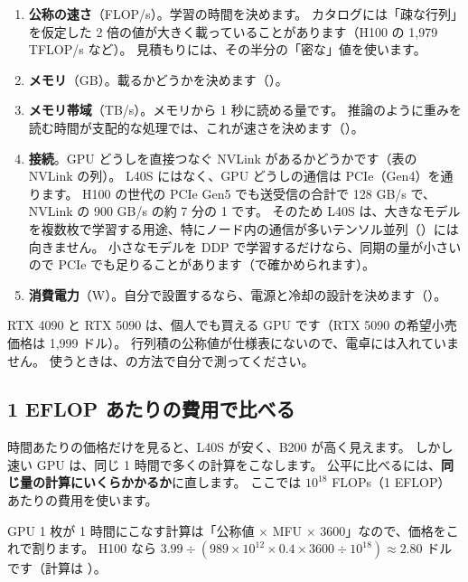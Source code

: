 \begin{enumerate}
\item \textbf{公称の速さ}（FLOP/s）。学習の時間を決めます。
カタログには「疎な行列」を仮定した 2 倍の値が大きく載っていることがあります（H100 の 1,979 TFLOP/s など）。
見積もりには、その半分の「密な」値を使います。
\item \textbf{メモリ}（GB）。載るかどうかを決めます（）。
\item \textbf{メモリ帯域}（TB/s）。メモリから 1 秒に読める量です。
推論のように重みを読む時間が支配的な処理では、これが速さを決めます（）。
\item \textbf{接続}。GPU どうしを直接つなぐ NVLink があるかどうかです（表の NVLink の列）。
L40S にはなく、GPU どうしの通信は PCIe（Gen4）を通ります。
H100 の世代の PCIe Gen5 でも送受信の合計で 128 GB/s で、NVLink の 900 GB/s の約 7 分の 1 です。
そのため L40S は、大きなモデルを複数枚で学習する用途、特にノード内の通信が多いテンソル並列（）には向きません。
小さなモデルを DDP で学習するだけなら、同期の量が小さいので PCIe でも足りることがあります（で確かめられます）。
\item \textbf{消費電力}（W）。自分で設置するなら、電源と冷却の設計を決めます（）。
\end{enumerate}

RTX 4090 と RTX 5090 は、個人でも買える GPU です（RTX 5090 の希望小売価格は 1,999 ドル）。
行列積の公称値が仕様表にないので、電卓には入れていません。
使うときは、の方法で自分で測ってください。

\subsection*{1 EFLOP あたりの費用で比べる}

時間あたりの価格だけを見ると、L40S が安く、B200 が高く見えます。
しかし速い GPU は、同じ 1 時間で多くの計算をこなします。
公平に比べるには、\textbf{同じ量の計算にいくらかかるか}に直します。
ここでは $10^{18}$ FLOPs（1 EFLOP）あたりの費用を使います。

GPU 1 枚が 1 時間にこなす計算は「公称値 $\times$ MFU $\times$ 3600」なので、価格をこれで割ります。
H100 なら $3.99\div(989\times10^{12}\times0.4\times3600\div10^{18})\approx2.80$ ドルです（計算は ）。

